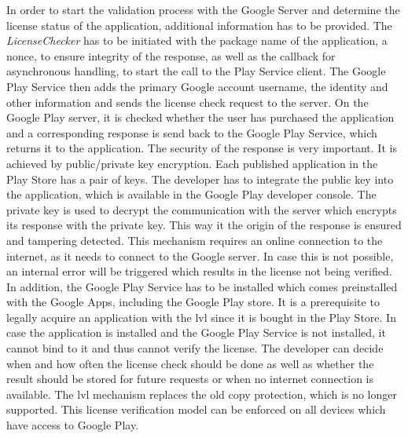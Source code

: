 In order to start the validation process with the Google Server and determine the license status of the application, additional information has to be provided.
The \textit{LicenseChecker} has to be initiated with the package name of the application, a nonce, to ensure integrity of the response, as well as the callback for asynchronous handling, to start the call to the Play Service client.
The Google Play Service then adds the primary Google account username, the identity and other information and sends the license check request to the server.
On the Google Play server, it is checked whether the user has purchased the application and a corresponding response is send back to the Google Play Service, which returns it to the application. \cite{developersLicensingOverview}
\newline
The security of the response is very important.
It is achieved by public/private key encryption.
Each published application in the Play Store has a pair of keys.
The developer has to integrate the public key into the application, which is available in the Google Play developer console.
The private key is used to decrypt the communication with the server which encrypts its response with the private key.
This way it the origin of the response is ensured and tampering detected.
\cite{munteanLicense} \cite{developersLicensingOverview}
\newline
This mechanism requires an online connection to the internet, as it needs to connect to the Google server.
In case this is not possible, an internal error will be triggered which results in the license not being verified.
In addition, the Google Play Service has to be installed which comes preinstalled with the Google Apps, including the Google Play store.
It is a prerequisite to legally acquire an application with the \gls{lvl} since it is bought in the Play Store.
In case the application is installed and the Google Play Service is not installed, it cannot bind to it and thus cannot verify the license.
The developer can decide when and how often the license check should be done as well as whether the result should be stored for future requests or when no internet connection is available. \cite{developersLicensingAdding } \cite{developersLicensingOverview}
\newline
The \gls{lvl} mechanism replaces the old copy protection, which is no longer supported.
This license verification model can be enforced on all devices which have access to Google Play. \cite{developersLicensingAdding} \cite{developersLicensingOverview}

